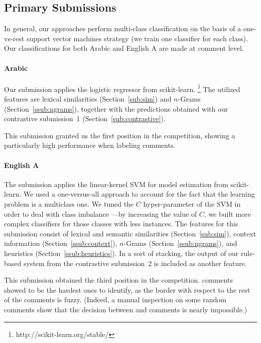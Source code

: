 \subsection{Primary Submissions}

In general, our approaches perform multi-class classification on the basis of a 
one-vs-rest support vector machines strategy (\ie we train one classifier for 
each class). Our classifications for both Arabic and English A are made at 
comment level.


\paragraph{Arabic} Our submission applies the logistic regressor from 
scikit-learn.%
\footnote{http://scikit-learn.org/stable/}
The utilized features are lexical similarities (Section~\ref{sub:sim}) and  
$n$-Grams (Section~\ref{ssub:ngrams}), together with the predictions obtained 
with our contrastive submission~1 (\cf Section~\ref{sub:contrastive}). 

This submission granted us the first position in the competition, showing a 
particularly high performance when labeling \rel comments.

\paragraph{English A}
The submission applies the linear-kernel SVM for model estimation from 
scikit-learn. We used a one-versus-all approach to account for the fact that 
the learning problem is a multiclass one. We tuned the $C$ hyper-parameter of 
the SVM in order to deal with class imbalance ---by increasing the value of 
$C$, we built more complex classifiers for those classes with less instances. 
% 
The features for this submission consist of lexical and semantic similarities 
(Section~\ref{sub:sim}), context information (Section~\ref{ssub:context}), 
$n$-Grams (Section~\ref{ssub:ngrams}), and heuristics 
(Section~\ref{ssub:heuristics}). In a sort of stacking, the output of our 
rule-based system from the contrastive submission~2 is included as another 
feature. 

This submission obtained the third position in the competition. \pot comments 
showed to be the hardest ones to identify, as the border with 
respect to the rest of the comments is fuzzy. (Indeed, a manual inspection on some 
random comments show that the decision between \good and \pot comments is nearly 
impossible.)

